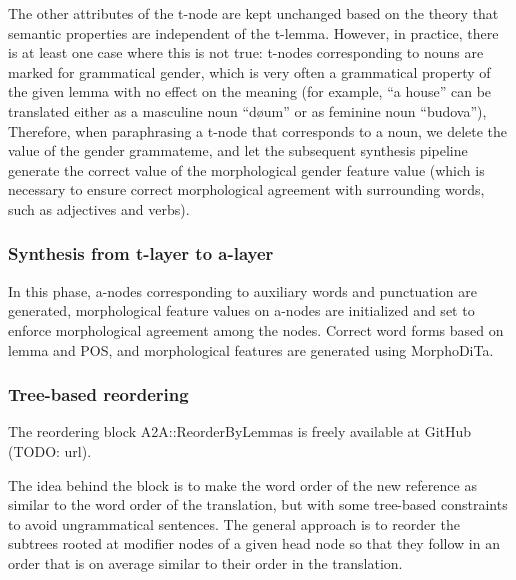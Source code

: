 \documentclass[11pt]{article}
\begin{document}
The other attributes of the t-node are kept unchanged based on the theory that
semantic properties are independent of the t-lemma. However, in practice, there 
is at least one case where this is not true: t-nodes corresponding to nouns are 
marked for grammatical gender, which is very often a grammatical property of 
the given lemma with no effect on the meaning (for example, “a house” can be 
translated either as a masculine noun “d\o{u}m” or as feminine noun “budova”),
Therefore, when paraphrasing a t-node that corresponds to a noun, we delete 
the value of the gender grammateme, and let the subsequent synthesis pipeline 
generate the correct value of the morphological gender feature value (which is 
necessary to ensure correct morphological agreement with surrounding words, 
such as adjectives and verbs).

\subsubsection{Synthesis from t-layer to a-layer}
In this phase, a-nodes corresponding to auxiliary words and punctuation are 
generated, morphological feature values on a-nodes are initialized and set to 
enforce morphological agreement among the nodes. Correct word forms based 
on lemma and POS, and morphological features are generated using MorphoDiTa.

\subsubsection{Tree-based reordering}
The reordering block A2A::ReorderByLemmas is freely available at GitHub (TODO: url).

The idea behind the block is to make the word order of the new reference as 
similar to the word order of the translation, but with some tree-based 
constraints to avoid ungrammatical sentences. The general approach is to 
reorder the subtrees rooted at modifier nodes of a given head node so that they 
follow in an order that is on average similar to their order in the translation.

\end{document}
